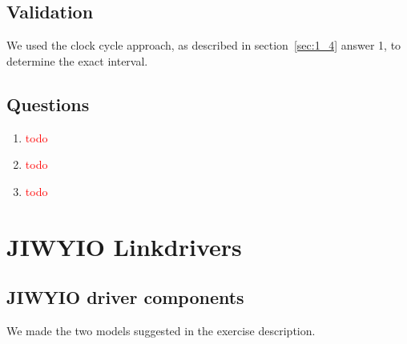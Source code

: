 \documentclass[a4paper,twoside,11pt]{article}
\newcommand{\todo}[1]{{\Large\sc\textcolor{red}{#1}}}
\begin{document}
\FloatBarrier
\subsection{Validation}
We used the clock cycle approach, as described in section~\ref{sec:1_4} answer 1, to determine the exact interval.

\subsection{Questions}
\begin{enumerate}
 \item \todo{todo}
 \item \todo{todo}
 \item \todo{todo}
\end{enumerate}

\section{JIWYIO Linkdrivers}
\subsection{JIWYIO driver components}
We made the two models suggested in the exercise description.
\end{document}
